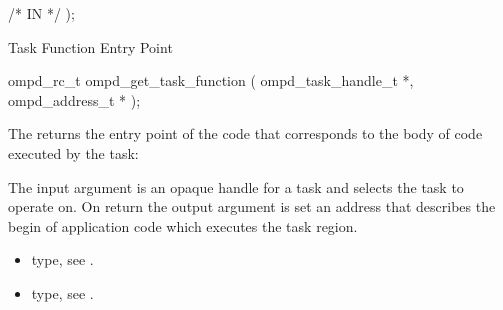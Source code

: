 %
  /* IN */
);
%
%


\label{ompd:ompd_get_task_function}
\summary
Task Function Entry Point
\format
\cspecificstart
\begin{ompSyntax}
ompd_rc_t ompd_get_task_function (
  ompd_task_handle_t *,
  ompd_address_t *
);
\end{ompSyntax}
\cspecificend

\descr
The  returns the entry point of the code
that corresponds to the body of code executed by the task:

\argdesc
The input argument  is an opaque handle for a task and selects the task to operate on.
On return the output argument  is set an address that describes the begin of application
code which executes the task region.

\crossreferences
\begin{itemize}
	\item {} type, see .
	\item {} type, see .
\end{itemize}


